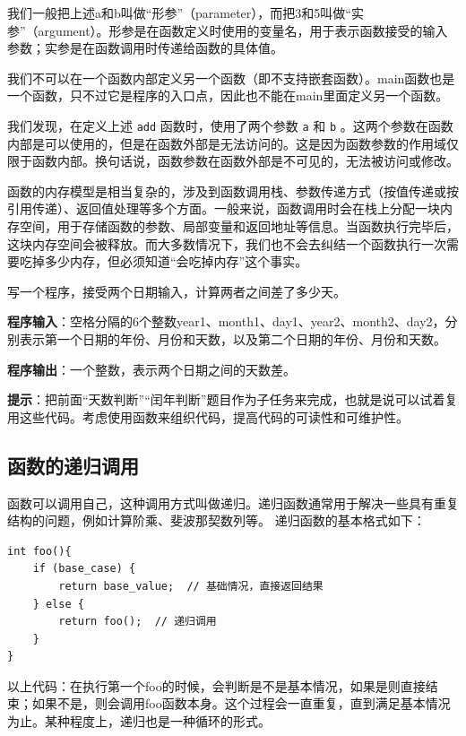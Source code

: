 我们一般把上述a和b叫做“形参”（parameter），而把3和5叫做“实参”（argument）。形参是在函数定义时使用的变量名，用于表示函数接受的输入参数；实参是在函数调用时传递给函数的具体值。

我们不可以在一个函数内部定义另一个函数（即不支持嵌套函数）。main函数也是一个函数，只不过它是程序的入口点，因此也不能在main里面定义另一个函数。

我们发现，在定义上述 \texttt{add} 函数时，使用了两个参数 \texttt{a} 和 \texttt{b} 。这两个参数在函数内部是可以使用的，但是在函数外部是无法访问的。这是因为函数参数的作用域仅限于函数内部。换句话说，函数参数在函数外部是不可见的，无法被访问或修改。

函数的内存模型是相当复杂的，涉及到函数调用栈、参数传递方式（按值传递或按引用传递）、返回值处理等多个方面。一般来说，函数调用时会在栈上分配一块内存空间，用于存储函数的参数、局部变量和返回地址等信息。当函数执行完毕后，这块内存空间会被释放。而大多数情况下，我们也不会去纠结一个函数执行一次需要吃掉多少内存，但必须知道“会吃掉内存”这个事实。

\begin{exercise}[日期差加强版]
写一个程序，接受两个日期输入，计算两者之间差了多少天。

\textbf{程序输入}：空格分隔的6个整数year1、month1、day1、year2、month2、day2，分别表示第一个日期的年份、月份和天数，以及第二个日期的年份、月份和天数。

\textbf{程序输出}：一个整数，表示两个日期之间的天数差。

\textbf{提示}：把前面“天数判断”“闰年判断”题目作为子任务来完成，也就是说可以试着复用这些代码。考虑使用函数来组织代码，提高代码的可读性和可维护性。
    
\end{exercise}

\subsection{函数的递归调用}

函数可以调用自己，这种调用方式叫做递归。递归函数通常用于解决一些具有重复结构的问题，例如计算阶乘、斐波那契数列等。
递归函数的基本格式如下：
\begin{verbatim}
int foo(){
    if (base_case) {
        return base_value;  // 基础情况，直接返回结果
    } else {
        return foo();  // 递归调用
    }
}
\end{verbatim}

以上代码：在执行第一个foo的时候，会判断是不是基本情况，如果是则直接结束；如果不是，则会调用foo函数本身。这个过程会一直重复，直到满足基本情况为止。某种程度上，递归也是一种循环的形式。

